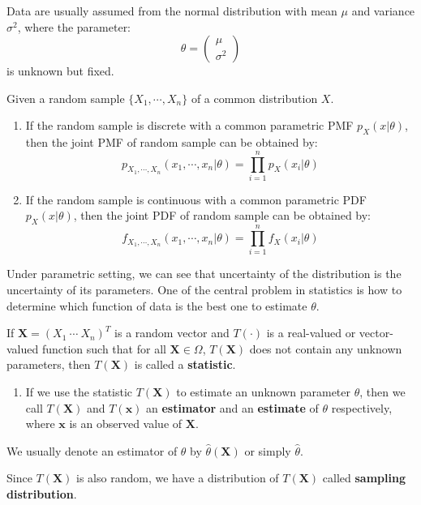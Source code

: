 \documentclass{huhtakm-template-book-v2}
\begin{document}
\newpage
\begin{eg}
	Data are usually assumed from the normal distribution with mean $\mu$ and variance $\sigma^{2}$, where the parameter:
	\begin{equation*}
		\theta=\begin{pmatrix}
			\mu\\
			\sigma^{2}
		\end{pmatrix}
	\end{equation*}
	is unknown but fixed.
\end{eg}
\begin{lem}
	Given a random sample $\{X_{1},\cdots,X_{n}\}$ of a common distribution $X$.
	\begin{enumerate}
		\item If the random sample is discrete with a common parametric PMF $p_{X}(x|\theta)$, then the joint PMF of random sample can be obtained by:
		\begin{equation*}
			p_{X_{1},\cdots,X_{n}}(x_{1},\cdots,x_{n}|\theta)=\prod_{i=1}^{n}p_{X}(x_{i}|\theta)
		\end{equation*}
		\item If the random sample is continuous with a common parametric PDF $p_{X}(x|\theta)$, then the joint PDF of random sample can be obtained by:
		\begin{equation*}
			f_{X_{1},\cdots,X_{n}}(x_{1},\cdots,x_{n}|\theta)=\prod_{i=1}^{n}f_{X}(x_{i}|\theta)
		\end{equation*}
	\end{enumerate}
\end{lem}
Under parametric setting, we can see that uncertainty of the distribution is the uncertainty of its parameters. One of the central problem in statistics is how to determine which function of data is the best one to estimate $\theta$.
\begin{defn}
	If $\mathbf{X}=(X_{1}\ \cdots\ X_{n})^{T}$ is a random vector and $T(\cdot)$ is a real-valued or vector-valued function such that for all $\mathbf{X}\in\Omega$, $T(\mathbf{X})$ does not contain any unknown parameters, then $T(\mathbf{X})$ is called a \textbf{statistic}.
	\begin{enumerate}
		\item If we use the statistic $T(\mathbf{X})$ to estimate an unknown parameter $\theta$, then we call $T(\mathbf{X})$ and $T(\mathbf{x})$ an \textbf{estimator} and an \textbf{estimate} of $\theta$ respectively, where $\mathbf{x}$ is an observed value of $\mathbf{X}$.
	\end{enumerate}
\end{defn}
\begin{rem}
	We usually denote an estimator of $\theta$ by $\hat{\theta}(\mathbf{X})$ or simply $\hat{\theta}$.
\end{rem}
\begin{rem}
	Since $T(\mathbf{X})$ is also random, we have a distribution of $T(\mathbf{X})$ called \textbf{sampling distribution}.
\end{rem}
\end{document}
